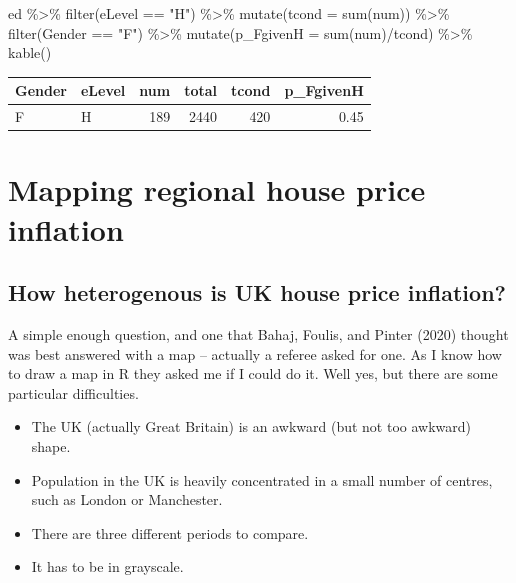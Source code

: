 \documentclass[
  letterpaper,
]{book}
\newenvironment{Shaded}{\begin{snugshade}}{\end{snugshade}}
\newcommand{\AttributeTok}[1]{\textcolor[rgb]{0.40,0.45,0.13}{#1}}
\newcommand{\FunctionTok}[1]{\textcolor[rgb]{0.28,0.35,0.67}{#1}}
\newcommand{\NormalTok}[1]{\textcolor[rgb]{0.00,0.23,0.31}{#1}}
\newcommand{\SpecialCharTok}[1]{\textcolor[rgb]{0.37,0.37,0.37}{#1}}
\newcommand{\StringTok}[1]{\textcolor[rgb]{0.13,0.47,0.30}{#1}}
\providecommand{\tightlist}{%
  \setlength{\itemsep}{0pt}\setlength{\parskip}{0pt}}\usepackage{longtable,booktabs,array}
\begin{document}
\begin{Shaded}
\begin{Highlighting}[]
\NormalTok{ed }\SpecialCharTok{\%\textgreater{}\%}
  \FunctionTok{filter}\NormalTok{(eLevel }\SpecialCharTok{==} \StringTok{"H"}\NormalTok{) }\SpecialCharTok{\%\textgreater{}\%}
  \FunctionTok{mutate}\NormalTok{(}\AttributeTok{tcond =} \FunctionTok{sum}\NormalTok{(num)) }\SpecialCharTok{\%\textgreater{}\%} 
  \FunctionTok{filter}\NormalTok{(Gender }\SpecialCharTok{==} \StringTok{"F"}\NormalTok{) }\SpecialCharTok{\%\textgreater{}\%}
  \FunctionTok{mutate}\NormalTok{(}\AttributeTok{p\_FgivenH =} \FunctionTok{sum}\NormalTok{(num)}\SpecialCharTok{/}\NormalTok{tcond) }\SpecialCharTok{\%\textgreater{}\%}
  \FunctionTok{kable}\NormalTok{()}
\end{Highlighting}
\end{Shaded}

\begin{longtable}[]{@{}llrrrr@{}}
\toprule()
Gender & eLevel & num & total & tcond & p\_FgivenH \\
\midrule()
\endhead
F & H & 189 & 2440 & 420 & 0.45 \\
\bottomrule()
\end{longtable}

\hypertarget{mapping-regional-house-price-inflation}{%
\chapter{Mapping regional house price
inflation}\label{mapping-regional-house-price-inflation}}

\hypertarget{how-heterogenous-is-uk-house-price-inflation}{%
\section{How heterogenous is UK house price
inflation?}\label{how-heterogenous-is-uk-house-price-inflation}}

A simple enough question, and one that Bahaj, Foulis, and Pinter (2020)
thought was best answered with a map -- actually a referee asked for
one. As I know how to draw a map in R they asked me if I could do it.
Well yes, but there are some particular difficulties.

\begin{itemize}
\tightlist
\item
  The UK (actually Great Britain) is an awkward (but not too awkward)
  shape.
\item
  Population in the UK is heavily concentrated in a small number of
  centres, such as London or Manchester.
\item
  There are three different periods to compare.
\item
  It has to be in grayscale.
\end{itemize}
\end{document}
